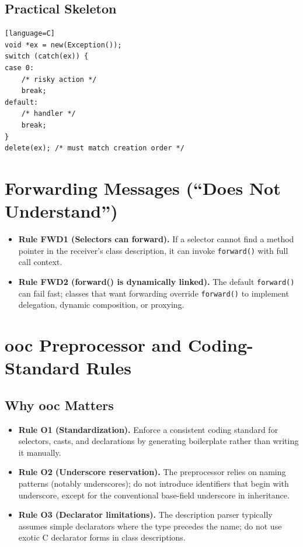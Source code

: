 \documentclass[11pt]{article}
\begin{document}
\subsection{Practical Skeleton}

\begin{verbatim}[language=C]
void *ex = new(Exception());
switch (catch(ex)) {
case 0:
    /* risky action */
    break;
default:
    /* handler */
    break;
}
delete(ex); /* must match creation order */
\end{verbatim}

\section{Forwarding Messages (``Does Not Understand'')}

\begin{itemize}
  \item \textbf{Rule FWD1 (Selectors can forward).} If a selector cannot find a method pointer in the receiver's class description, it can invoke \texttt{forward()} with full call context.
  \item \textbf{Rule FWD2 (forward() is dynamically linked).} The default \texttt{forward()} can fail fast; classes that want forwarding override \texttt{forward()} to implement delegation, dynamic composition, or proxying.
\end{itemize}

\section{ooc Preprocessor and Coding-Standard Rules}

\subsection{Why ooc Matters}

\begin{itemize}
  \item \textbf{Rule O1 (Standardization).} Enforce a consistent coding standard for selectors, casts, and declarations by generating boilerplate rather than writing it manually.
  \item \textbf{Rule O2 (Underscore reservation).} The preprocessor relies on naming patterns (notably underscores); do not introduce identifiers that begin with underscore, except for the conventional base-field underscore in inheritance.
  \item \textbf{Rule O3 (Declarator limitations).} The description parser typically assumes simple declarators where the type precedes the name; do not use exotic C declarator forms in class descriptions.
\end{itemize}
\end{document}
